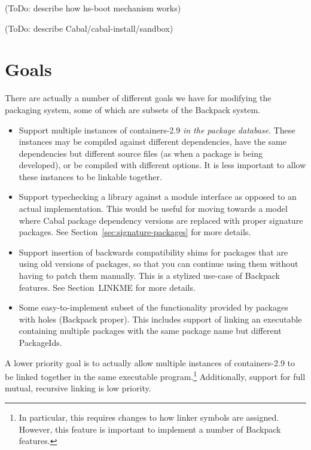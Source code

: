 \documentclass{article}
\begin{document}
(ToDo: describe how hs-boot mechanism works)

(ToDo: describe Cabal/cabal-install/sandbox)

\section{Goals}

There are actually a number of different goals we have for modifying the
packaging system, some of which are subsets of the Backpack system.

\begin{itemize}
    \item Support multiple instances of containers-2.9 \emph{in the
        package database}.  These instances may be compiled against
        different dependencies, have the same dependencies but different
        source files (as when a package is being developed), or be
        compiled with different options.  It is less important to allow
        these instances to be linkable together.

    \item Support typechecking a library against a module interface
        as opposed to an actual implementation.  This would be useful
        for moving towards a model where Cabal package dependency versions
        are replaced with proper signature packages.  See Section~\ref{sec:signature-packages}
        for more details.

    \item Support insertion of backwards compatibility shims for packages
        that are using old versions of packages, so that you can continue
        using them without having to patch them manually.  This is a
        stylized use-case of Backpack features.  See Section~LINKME for
        more details.

    \item Some easy-to-implement subset of the functionality provided by
        packages with holes (Backpack proper).  This includes support
        of linking an executable containing multiple packages with the
        same package name but different PackageIds.
\end{itemize}

A lower priority goal is to actually allow multiple instances of
containers-2.9 to be linked together in the same executable
program.\footnote{In particular, this requires changes to how linker
symbols are assigned. However, this feature is important to
implement a number of Backpack features.}  Additionally, support for
full mutual, recursive linking is low priority.
\end{document}
